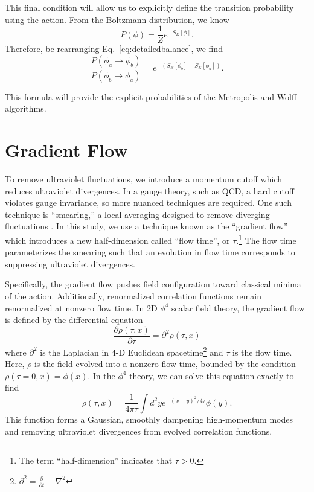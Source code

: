 \documentclass[12pt]{report}
\begin{document}
This final condition will allow us to explicitly define the transition probability using the action. From the Boltzmann distribution, we know
\begin{equation}
    P(\phi) = \frac{1}{Z} e^{-S_E[\phi]}.
\end{equation}
Therefore, be rearranging Eq.~\ref{eq:detailedbalance}, we find
\begin{equation}
    \frac{P(\phi_a\rightarrow\phi_b)}{P(\phi_b\rightarrow\phi_a)} = e^{-(S_E[\phi_b] - S_E[\phi_a])}.
\end{equation}

This formula will provide the explicit probabilities of the Metropolis and Wolff algorithms.


\section{Gradient Flow}
\label{sec:gradflow}
To remove ultraviolet fluctuations, we introduce a momentum cutoff which reduces ultraviolet divergences. In a gauge theory, such as QCD, a hard cutoff violates gauge invariance, so more nuanced techniques are required. One such technique is ``smearing,'' a local averaging designed to remove diverging fluctuations \cite{solbrig2007}. In this study, we use a technique known as the ``gradient flow'' \cite{monahan2015} which introduces a new half-dimension called ``flow time'', or $\tau$.\footnote{The term ``half-dimension'' indicates that $\tau>0$.}  The flow time parameterizes the smearing such that an evolution in flow time corresponds to suppressing ultraviolet divergences. 

Specifically, the gradient flow pushes field configuration toward classical minima of the action. Additionally, renormalized correlation functions remain renormalized at nonzero flow time.\cite{luscher2013} In 2D $\phi^4$ scalar field theory, the gradient flow is defined by the differential equation 
\begin{equation}
    \frac{\partial \rho(\tau, x)}{\partial \tau} = \partial^2 \rho(\tau,x)
\end{equation}
where $\partial^2$ is the Laplacian in 4-D Euclidean spacetime\footnote{$\partial^2 = \frac{\partial}{\partial t} - \nabla^2$} and $\tau$ is the flow time. Here, $\rho$ is the field evolved into a nonzero flow time, bounded by the condition $\rho(\tau=0,x) = \phi(x)$. In the $\phi^4$ theory, we can solve this equation exactly to find
\begin{equation}
    \rho(\tau, x) = \frac{1}{4 \pi \tau} \int d^2 y e^{-(x-y)^2/4\tau} \phi(y).
\end{equation}
This function forms a Gaussian, smoothly dampening high-momentum modes and removing ultraviolet divergences from evolved correlation functions.\cite{makino2015a}
\end{document}
